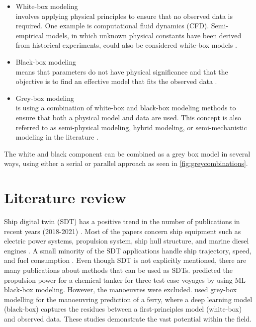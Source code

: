 \begin{itemize}
    \item White-box modeling \\
    involves applying physical principles to ensure that no observed data is required. One example is computational fluid dynamics (CFD). Semi-empirical models, in which unknown physical constants have been derived from historical experiments, could also be considered white-box models \cite{leifsson_grey-box_2008}.  

    \item Black-box modeling \\
    means that parameters do not have physical significance and that the objective is to find an effective model that fits the observed data \cite{lindskog_tools_1995}.
    
    \item Grey-box modeling \\
    is using a combination of white-box and black-box modeling methods to ensure that both a physical model and data are used. This concept is also referred to as semi-physical modeling, hybrid modeling, or semi-mechanistic modeling in the literature \cite{leifsson_grey-box_2008}. 
\end{itemize}

\noindent The white and black component can be combined as a grey box model in several ways, using either a serial or parallel approach \cite{leifsson_grey-box_2008} as seen in \autoref{fig:greycombinations}. 



\section{Literature review}
Ship digital twin (SDT) has a positive trend in the number of publications in recent years (2018-2021)  \cite{assani_ships_2022}. Most of the papers concern ship equipment such as electric power systems, propulsion system, ship hull structure, and marine diesel engines \cite{assani_ships_2022}. A small minority of the SDT applications handle ship trajectory, speed, and fuel consumption \cite{assani_ships_2022}.   
Even though SDT is not explicitly mentioned, there are many publications about methods that can be used as SDTs. \textcite{lang_comparison_2022} predicted the propulsion power for a chemical tanker for three test case voyages by using ML black-box modeling. However, the manoeuvres were excluded. \textcite{nielsen_machine_2022} used grey-box modelling for the manoeuvring prediction of a ferry, where a deep learning model (black-box) captures the residues between a first-principles model (white-box) and observed data. These studies demonstrate the vast potential within the field.


